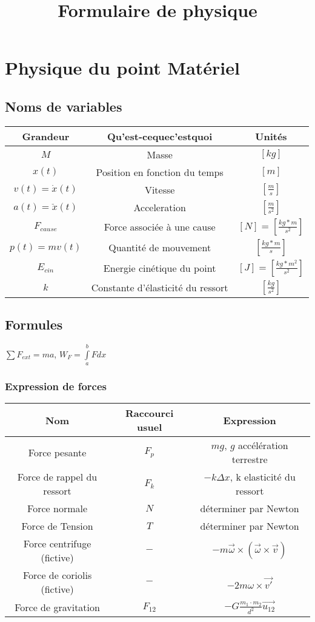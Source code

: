 \documentclass[10pt,a4paper]{article}
\title{Formulaire de physique}
\begin{document}
\section{Physique du point Matériel}

\subsection{Noms de variables}

\begin{tabular}{|c|c|c|}
\hline 
Grandeur & Qu'est-cequec'estquoi & Unités \\ 
\hline 
$M$ & Masse & $[kg]$ \\
\hline
$x(t)$ & Position en fonction du temps & $[m]$ \\ 
\hline
$v(t) = \dot{x}(t)$ & Vitesse & $[\frac{m}{s}]$ \\
\hline
$a(t) = \ddot{x}(t)$ & Acceleration & $[\frac{m}{s^2}]$ \\
\hline
$F_{cause}$ & Force associée à une cause & $[N] = [\frac{kg*m}{s^2}]$ \\
\hline
$p(t) = mv(t)$ & Quantité de mouvement & $[\frac{kg*m}{s}]$ \\
\hline
$E_{cin}$ & Energie cinétique du point & $[J] = [\frac{kg*m^2}{s^2}]$ \\
\hline
$k$ & Constante d'élasticité du ressort & $[\frac{kg}{s^2}]$\\
\hline
\end{tabular}

\subsection{Formules}

$\sum F_{ext} = ma$, $W_F = \int\limits_a^b F dx$

\subsubsection{Expression de forces}

\begin{tabular}{c|c|c}
Nom & Raccourci usuel & Expression \\
\hline
Force pesante & $F_p$ & $mg$, $g$ accélération terrestre \\
Force de rappel du ressort & $F_k$ & $-k\Delta x$, k elasticité du ressort\\
Force normale & $N$ & déterminer par Newton \\
Force de Tension & $T$ & déterminer par Newton \\
Force centrifuge (fictive) & $-$ & $-m\vec\omega \times (\vec\omega \times \vec v)$ \\
Force de coriolis (fictive) & $-$ & $-2m\omega \times \vec{v'}$ \\
Force de gravitation & $F_{12}$ & $-G\frac{m_1 \cdot m_2}{d^2}\vec{u_{12}}$

\end{tabular}
\end{document}

